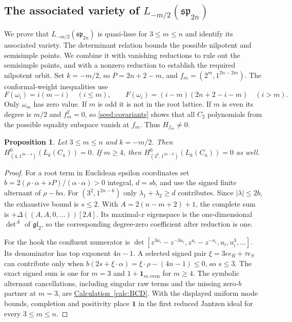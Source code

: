 \documentclass[11pt,a4paper]{amsart}
\numberwithin{equation}{section}
\newtheorem{proposition}[theorem]{Proposition}
\theoremstyle{definition}
\theoremstyle{remark}
\newcommand{\spg}{\mathfrak{sp}}
\newcommand{\glg}{\mathfrak{gl}}
\begin{document}
\subsection{\texorpdfstring{The associated variety of $L_{-m/2}(\spg_{2n})$}{The associated variety of L(-m/2)(sp(2n))}}\label{seed:C-positive}
We prove that $L_{-m/2}(\spg_{2n})$ is quasi-lisse for $3\le m\le n$
and identify its associated variety. The determinant relation bounds
the possible nilpotent and semisimple points. We combine it with
vanishing reductions to rule out the semisimple points, and with a
nonzero reduction to establish the required nilpotent orbit. Set $k=-m/2$, so $P=2n+2-m$, and
$f_m=(2^m,1^{2n-2m})$. The conformal-weight inequalities use
$$
 F(\omega_i)=i(m-i)\quad(i\le m),\qquad
 F(\omega_i)=(i-m)(2n+2-i-m)\quad(i>m).
$$
Only $\omega_m$ has zero value. If $m$ is odd it is not in the root
lattice. If $m$ is even its degree is $m/2$ and $f_m^2=0$, so
\cref{seed:covariants} shows that all $C_2$ polynomials from the
possible equality subspace vanish at $f_m$. Thus $H_{f_m}\ne0$.

\begin{proposition}\label{seed:C-vacuum}
Let $3\le m\le n$ and $k=-m/2$. Then
$H^0_{(4,1^{2n-4})}(L_k(C_n))=0$. If $m\ge4$, then
$H^0_{(3^2,1^{2n-6})}(L_k(C_n))=0$ as well.
\end{proposition}
\begin{proof}
For a root term in Euclidean epsilon coordinates set
$b=2(\rho\cdot\alpha+sP)/(\alpha\cdot\alpha)>0$ integral,
$d=sb$, and use the signed finite alternant of $\rho-b\alpha$.
For $(3^2,1^{2n-6})$ only $\lambda_1+\lambda_2\ge d$ contributes.
Since $|\lambda|\le2b$, the exhaustive bound is $s\le2$.
With $A=2(n-m+2)+1$, the complete sum is
$+\Delta((A,A,0,\ldots))[2A]$. Its maximal-$x$ eigenspace is the one-dimensional
$\det^A$ of $\glg_2$, so the corresponding degree-zero coefficient after reduction is one.

For the hook the confluent numerator is
$\det[z^{3u_i}-z^{-3u_i},z^{u_i}-z^{-u_i},u_i,u_i^3,\ldots]$.
Its denominator has top exponent $4n-1$.
A selected signed pair $\xi=3\epsilon e_R+\tau e_S$ can contribute
only when $b(2s+\xi\cdot\alpha)=\xi\cdot\rho-(4n-1)\le0$,
so $s\le3$. The exact signed sum is one for $m=3$ and
$1+\mathbf1_{m\text{ even}}$ for $m\ge4$.
The symbolic alternant cancellations, including singular raw terms
and the missing zero-$b$ partner at $m=3$, are
\hyperref[calc:BCD]{Calculation~\ref*{calc:BCD}}. With the displayed uniform mode bounds, completion and positivity
place $\mathbf1$ in the first reduced Jantzen ideal for every $3\le m\le n$.
\end{proof}
\end{document}
